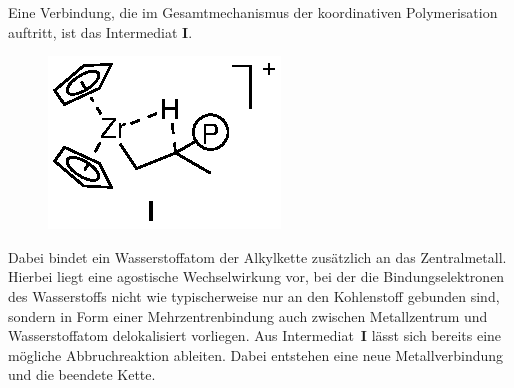 \documentclass[../kl11.tex]{subfiles}
\begin{document}
 Eine Verbindung, die im Gesamtmechanismus der koordinativen Polymerisation auftritt, ist das Intermediat \textbf{I}. 
 \begin{figure}[H]
     \centering
     \includegraphics[width=0.35\linewidth]{2024/Abbildungen/Ziegler-Natta/2.eps}
 \end{figure}

 Dabei bindet ein Wasserstoffatom der Alkylkette zusätzlich an das Zentralmetall. Hierbei liegt eine agostische Wechselwirkung vor, bei der die Bindungselektronen des Wasserstoffs nicht wie typischerweise nur an den Kohlenstoff gebunden sind, sondern in Form einer Mehrzentrenbindung auch zwischen Metallzentrum und Wasserstoffatom delokalisiert vorliegen.
 \newpage
 Aus Intermediat~\textbf{I} lässt sich bereits eine mögliche Abbruchreaktion ableiten. Dabei entstehen eine neue Metallverbindung und die beendete Kette.
\end{document}
